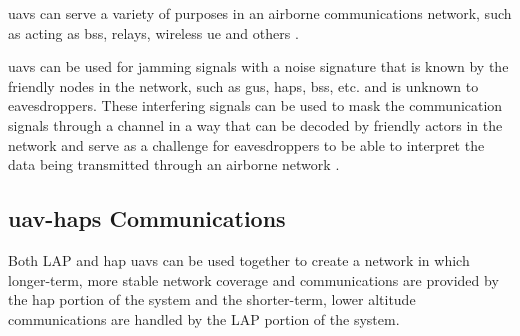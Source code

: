 \acrshort{uav}s can serve a variety of purposes in an airborne communications network, such as acting as \acrshort{bs}s, relays, wireless \acrfull{ue} and others \cite{namuduri_uav_2017, saad_wireless_2020}.

\acrshort{uav}s can be used for jamming signals with a noise signature that is known by the friendly nodes in the network, such as \acrshort{gu}s, \acrshort{hap}s, \acrshort{bs}s, etc. and is unknown to eavesdroppers. These interfering signals can be used to mask the communication signals through a channel in a way that can be decoded by friendly actors in the network and serve as a challenge for eavesdroppers to be able to interpret the data being transmitted through an airborne network \cite{zhang_one_2025, lohan_secrecy-aware_2022}. 

\subsection{\texorpdfstring{\acrshort{uav}-\acrshort{hap}s}{UAV-HAPs} Communications}
Both LAP and \acrshort{hap} \acrshort{uav}s can be used together \cite{zhang_energy-efficient_2024, ji_joint_2023, zhang_one_2025, qin_secure_2023} to create a network in which longer-term, more stable network coverage and communications are provided by the \acrshort{hap} portion of the system and the shorter-term, lower altitude communications are handled by the LAP portion of the system. 

